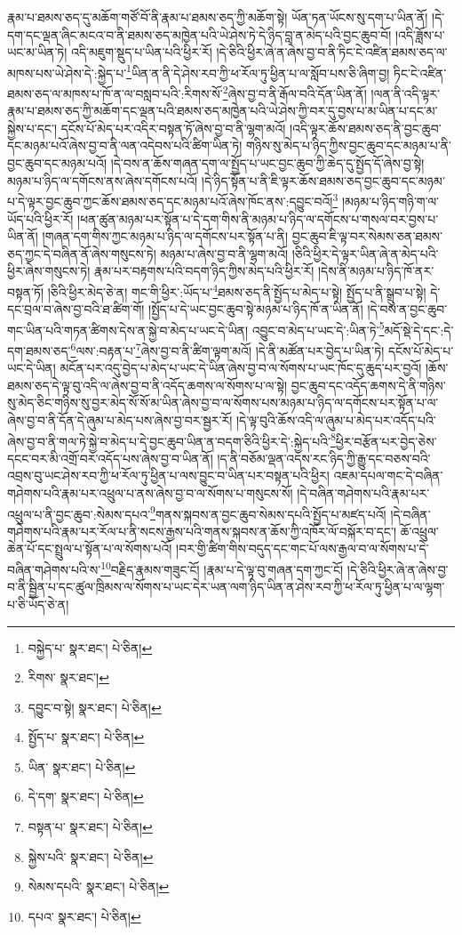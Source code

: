 རྣམ་པ་ཐམས་ཅད་དུ་མཆོག་གཙོ་བོ་ནི་རྣམ་པ་ཐམས་ཅད་ཀྱི་མཆོག་སྟེ། ཡོན་ཏན་ཡོངས་སུ་དག་པ་ཡིན་ནོ། །དེ་དག་དང་ལྡན་ཞིང་མངའ་བ་ནི་ཐམས་ཅད་མཁྱེན་པའི་ཡེ་ཤེས་ཏེ་དེ་ཉིད་བླ་ན་མེད་པའི་བྱང་ཆུབ་བོ། །འདི་ཟློས་པ་ཡང་མ་ཡིན་ཏེ། འདི་མཇུག་སྡུད་པ་ཡིན་པའི་ཕྱིར་རོ། །དེ་ཅིའི་ཕྱིར་ཞེ་ན་ཞེས་བྱ་བ་ནི་ཏིང་ངེ་འཛིན་ཐམས་ཅད་ལ་མཁས་པས་ཡེ་ཤེས་དེ་:སྐྱེད་པ་\footnote{བསྐྱེད་པ་  སྣར་ཐང་།  པེ་ཅིན། }ཡིན་ན་ནི་དེ་ཤེས་རབ་ཀྱི་ཕ་རོལ་ཏུ་ཕྱིན་པ་ལ་སློབ་པས་ཅི་ཞིག་བྱ། ཏིང་ངེ་འཛིན་ཐམས་ཅད་ལ་མཁས་པ་ཁོ་ན་ལ་བསླབ་པའི་:རིགས་སོ་\footnote{རིགས་  སྣར་ཐང་། }ཞེས་བྱ་བ་ནི་རྒོལ་བའི་དོན་ཡིན་ནོ། །ལན་ནི་འདི་ལྟར་རྣམ་པ་ཐམས་ཅད་ཀྱི་མཆོག་དང་ལྡན་པའི་ཐམས་ཅད་མཁྱེན་པའི་ཡེ་ཤེས་ཀྱི་བར་དུ་བྱས་པ་མ་ཡིན་པ་དང་མ་སྐྱེས་པ་དང་། དངོས་པོ་མེད་པར་འདིར་བསྟན་ཏོ་ཞེས་བྱ་བ་ནི་ལྷག་མའོ། །འདི་ལྟར་ཆོས་ཐམས་ཅད་ནི་བྱང་ཆུབ་དང་མཉམ་པའོ་ཞེས་བྱ་བ་ནི་ལན་འདེབས་པའི་ཚིག་ཡིན་ཏེ། གཉིས་སུ་མེད་པ་ཉིད་ཀྱིས་བྱང་ཆུབ་དང་མཉམ་པ་ནི་བྱང་ཆུབ་དང་མཉམ་པའོ། །དེ་བས་ན་ཆོས་གཞན་དག་ལ་སྤྱོད་པ་ཡང་བྱང་ཆུབ་ཀྱི་ཆེད་དུ་སྤྱོད་དོ་ཞེས་བྱ་སྟེ། མཉམ་པ་ཉིད་ལ་དགོངས་ནས་ཞེས་དགོངས་པའོ། །དེ་ཉིད་སྟོན་པ་ནི་ཇི་ལྟར་ཆོས་ཐམས་ཅད་བྱང་ཆུབ་དང་མཉམ་པ་དེ་ལྟར་བྱང་ཆུབ་ཀྱང་ཆོས་ཐམས་ཅད་དང་མཉམ་པའོ་ཞེས་ཁོང་ནས་:དབྱུང་བའོ།\footnote{དབྱུང་བ་སྟེ།  སྣར་ཐང་།  པེ་ཅིན། } །མཉམ་པ་ཉིད་གཉི་ག་ལ་ཡོད་པའི་ཕྱིར་རོ། །ཕན་ཚུན་མཉམ་པར་སྟོན་པ་དེ་དག་གིས་ནི་མཉམ་པ་ཉིད་ལ་དགོངས་པ་གསལ་བར་བྱས་པ་ཡིན་ནོ། །གཞན་དག་གིས་ཀྱང་མཉམ་པ་ཉིད་ལ་དགོངས་པར་སྟོན་པ་ནི། བྱང་ཆུབ་ཇི་ལྟ་བར་སེམས་ཅན་ཐམས་ཅད་ཀྱང་དེ་བཞིན་ནོ་ཞེས་གསུངས་ཏེ། མཉམ་པ་ཞེས་བྱ་བ་ནི་ལྷག་མའོ། །ཅིའི་ཕྱིར་དེ་ལྟར་ཡིན་ཞེ་ན་མེད་པའི་ཕྱིར་ཞེས་གསུངས་ཏེ། རྣམ་པར་བརྟགས་པའི་བདག་ཉིད་ཀྱིས་མེད་པའི་ཕྱིར་རོ། །དེས་ནི་མཉམ་པ་ཉིད་ཁོ་ནར་བསྟན་ཏོ། །ཅིའི་ཕྱིར་མེད་ཅེ་ན། གང་གི་ཕྱིར་:ཡོད་པ་\footnote{སྤྱོད་པ་  སྣར་ཐང་།  པེ་ཅིན། }ཐམས་ཅད་ནི་སྤྱོད་པ་མེད་པ་སྟེ། སྤྱོད་པ་ནི་སྒྲུབ་པ་སྟེ། དེ་དང་བྲལ་བ་ཞེས་བྱ་བའི་ཐ་ཚིག་གོ། །སྤྱོད་པ་དེ་ཡང་བྱང་ཆུབ་སྟེ་མཉམ་པ་ཉིད་ཁོ་ན་ཡིན་ནོ། །དེ་བས་ན་བྱང་ཆུབ་གང་ཡིན་པའི་གཏན་ཚིགས་དེས་ན་སྐྱེ་བ་མེད་པ་ཡང་དེ་ཡིན། འབྱུང་བ་མེད་པ་ཡང་དེ་:ཡིན་ཏེ་\footnote{ཡིན་  སྣར་ཐང་།  པེ་ཅིན། }མདོ་སྡེ་དེ་དང་:དེ་དག་ཐམས་ཅད་\footnote{དེ་དག་  སྣར་ཐང་།  པེ་ཅིན། }ལས་:བརྟན་པ་\footnote{བསྟན་པ་  སྣར་ཐང་།  པེ་ཅིན། }ཞེས་བྱ་བ་ནི་ཚིག་ལྟག་མའོ། །དེ་ནི་མཚོན་པར་བྱེད་པ་ཡིན་ཏེ། དངོས་པོ་མེད་པ་ཡང་དེ་ཡིན། མངོན་པར་འདུ་བྱེད་པ་མེད་པ་ཡང་དེ་ཡིན་ཞེས་བྱ་བ་ལ་སོགས་པ་ཡང་ཁོང་དུ་ཆུད་པར་བྱའོ། །ཆོས་ཐམས་ཅད་དེ་ལྟ་བུ་འདི་ལ་ཞེས་བྱ་བ་ནི་འདོད་ཆགས་ལ་སོགས་པ་ལ་སྟེ། བྱང་ཆུབ་དང་འདོད་ཆགས་དེ་ནི་གཉིས་སུ་མེད་ཅིང་གཉིས་སུ་བྱར་མེད་སོ་སོ་མ་ཡིན་ཞེས་བྱ་བ་ལ་སོགས་པས་མཉམ་པ་ཉིད་ལ་དགོངས་པར་སྟོན་པ་ལ་ཞེས་བྱ་བ་ནི་དོན་དེ་ཞུམ་པ་མེད་པས་ཞེས་བྱ་བར་སྦྱར་རོ། །དེ་ལྟ་བུའི་ཆོས་འདི་ལ་ཞུམ་པ་མེད་པར་འདོད་པའི་ཞེས་བྱ་བ་ནི་གལ་ཏེ་སྐྱེ་བ་མེད་པ་དེ་བྱང་ཆུབ་ཡིན་ན་བདག་ཅིའི་ཕྱིར་དེ་:སྐྱེད་པའི་\footnote{སྐྱེས་པའི་  སྣར་ཐང་།  པེ་ཅིན། }ཕྱིར་བརྩོན་པར་བྱེད་ཅེས་དངང་བར་མི་འགྲོ་བར་འདོད་པས་ཞེས་བྱ་བ་ཡིན་ནོ། །ད་ནི་བཅོམ་ལྡན་འདས་རང་ཉིད་ཀྱི་རྒྱུ་དང་བཅས་བའི་འབྲས་བུ་ཡང་ཤེས་རབ་ཀྱི་ཕ་རོལ་ཏུ་ཕྱིན་པ་ལས་བྱུང་བ་ཡིན་པར་བསྟན་པའི་ཕྱིར། འཇམ་དཔལ་གང་དེ་བཞིན་གཤེགས་པའི་རྣམ་པར་འཕྲུལ་པ་ནས་ཞེས་བྱ་བ་ལ་སོགས་པ་གསུངས་སོ། །དེ་བཞིན་གཤེགས་པའི་རྣམ་པར་འཕྲུལ་པ་ནི་བྱང་ཆུབ་:སེམས་དཔའ་\footnote{སེམས་དཔའི་  སྣར་ཐང་།  པེ་ཅིན། }གནས་སྐབས་ན་བྱང་ཆུབ་སེམས་དཔའི་སྤྱོད་པ་མཛད་པའོ། །དེ་བཞིན་གཤེགས་པའི་རྣམ་པར་རོལ་པ་ནི་སངས་རྒྱས་པའི་གནས་སྐབས་ན་ཆོས་ཀྱི་འཁོར་ལོ་བསྐོར་བ་དང་། ཆོ་འཕྲུལ་ཆེན་པོ་དང་སྤྲུལ་པ་སྟོན་པ་ལ་སོགས་པའོ། །བར་གྱི་ཚིག་གིས་བདུད་དང་གང་པོ་ལས་རྒྱལ་བ་ལ་སོགས་པ་དེ་བཞིན་གཤེགས་པའི་ས་\footnote{དཔའ་  སྣར་ཐང་།  པེ་ཅིན། }བརྗིད་རྣམས་གཟུང་ངོ། །རྣམ་པ་དེ་ལྟ་བུ་གཞན་དག་ཀྱང་ངོ། །དེ་ཅིའི་ཕྱིར་ཞེ་ན་ཞེས་བྱ་བ་ནི་སྦྱིན་པ་དང་ཚུལ་ཁྲིམས་ལ་སོགས་པ་ཡང་དེར་ཡན་ལག་ཉིད་ཡིན་ན་ཤེས་རབ་ཀྱི་ཕ་རོལ་ཏུ་ཕྱིན་པ་ལ་ལྷག་པ་ཅི་ཡོད་ཅེ་ན། 